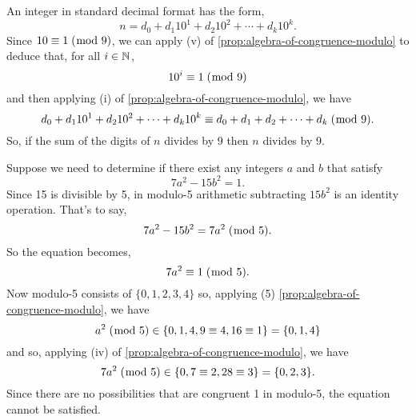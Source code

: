 \documentclass[../MathsNotesBase.tex]{subfiles}
\begin{document}
{\begin{exe}
			An integer in standard decimal format has the form,
			\[ n = d_0 + d_1 10^1 + d_2 10^2 + \cdots + d_k 10^k. \]
			Since ${ 10 \equiv 1 \;(\bmod\; 9) }$, we can apply (v) of \autoref{prop:algebra-of-congruence-modulo} to deduce that, for all ${ i \in \mathbb{N}^{} }$, 
			\[ 10^i \equiv 1 \;(\bmod\; 9) \]
			and then applying (i) of \autoref{prop:algebra-of-congruence-modulo}, we have
			\[ d_0 + d_1 10^1 + d_2 10^2 + \cdots + d_k 10^k \equiv d_0 + d_1 + d_2 + \cdots + d_k \;(\bmod\; 9). \]
			So, if the sum of the digits of $n$ divides by 9 then $n$ divides by 9.
			
			\biggerskip
			\ex Suppose we need to determine if there exist any integers $a$ and $b$ that satisfy
			\[ 7 a^2 - 15 b^2 = 1. \]
			Since 15 is divisible by 5, in modulo-5 arithmetic subtracting $15 b^2$ is an identity operation. That's to say,
			\[ 7 a^2 - 15 b^2 = 7 a^2 \;(\bmod\; 5). \]
			So the equation becomes,
			\[ 7 a^2 \equiv 1 \;(\bmod\; 5). \]
			Now modulo-5 consists of ${ \{0,1,2,3,4\} }$ so, applying (5) \autoref{prop:algebra-of-congruence-modulo}, we have
			\[ a^2 \;(\bmod\; 5) \in \{ 0, 1, 4, 9 \equiv 4, 16 \equiv 1 \} = \{ 0, 1, 4 \} \] 
			and so, applying (iv) of \autoref{prop:algebra-of-congruence-modulo}, we have
			\[ 7 a^2 \;(\bmod\; 5) \in \{ 0, 7 \equiv 2, 28 \equiv 3 \} = \{ 0, 2, 3 \}. \]
			Since there are no possibilities that are congruent 1 in modulo-5, the equation cannot be satisfied.
		\end{exe}
	}
\end{document}

